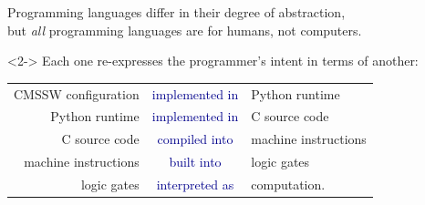 \documentclass[aspectratio=169]{beamer}
\begin{document}
\begin{frame}{}
\Large
\vspace{1.25 cm}
\begin{center}
Programming languages differ in their degree of abstraction, \\
but {\it all} programming languages are for humans, not computers.

\vspace{0.75 cm}
\begin{uncoverenv}<2->
Each one re-expresses the programmer's intent in terms of another:

\large
\vspace{0.25 cm}
\begin{tabular}{r c l}
CMSSW configuration & \textcolor{darkblue}{implemented in} & Python runtime \\
Python runtime & \textcolor{darkblue}{implemented in} & C source code \\
C source code & \textcolor{darkblue}{compiled into} & machine instructions \\
machine instructions & \textcolor{darkblue}{built into} & logic gates \\
logic gates & \textcolor{darkblue}{interpreted as} & computation.
\end{tabular}
\end{uncoverenv}

\vspace{0.75 cm}
\end{center}
\end{frame}
\end{document}
